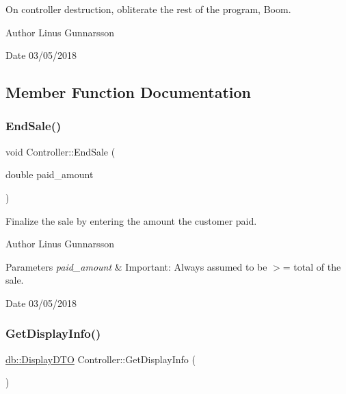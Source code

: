 On controller destruction, obliterate the rest of the program, Boom. \begin{DoxyAuthor}{Author}
Linus Gunnarsson 
\end{DoxyAuthor}
\begin{DoxyDate}{Date}
03/05/2018 
\end{DoxyDate}


\subsection{Member Function Documentation}
\mbox{\label{classController_a533d123d57b0aa61ee7e5e78dbd2ef27}} 
\subsubsection{\texorpdfstring{End\+Sale()}{EndSale()}}
{\footnotesize\ttfamily void Controller\+::\+End\+Sale (\begin{DoxyParamCaption}\item[{double}]{paid\+\_\+amount }\end{DoxyParamCaption})}

Finalize the sale by entering the amount the customer paid. \begin{DoxyAuthor}{Author}
Linus Gunnarsson 
\end{DoxyAuthor}

\begin{DoxyParams}{Parameters}
{\em paid\+\_\+amount} & Important\+: Always assumed to be $>$= total of the sale. \\
\hline
\end{DoxyParams}
\begin{DoxyDate}{Date}
03/05/2018 
\end{DoxyDate}
\mbox{\label{classController_aed4cd2b11a4d29b7efa272b806fa0813}} 
\subsubsection{\texorpdfstring{Get\+Display\+Info()}{GetDisplayInfo()}}
{\footnotesize\ttfamily \mbox{\hyperlink{classdb_1_1DisplayDTO}{db\+::\+Display\+D\+TO}} Controller\+::\+Get\+Display\+Info (\begin{DoxyParamCaption}{ }\end{DoxyParamCaption})}

